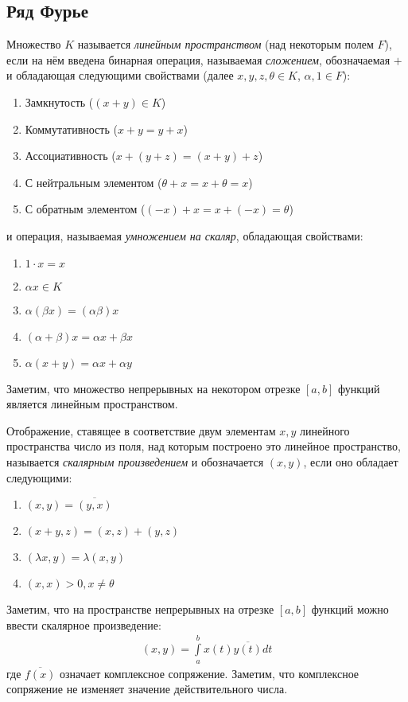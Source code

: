 \documentclass[a4paper]{article}
\begin{document}
\subsection*{Ряд Фурье}

Множество $K$ называется {\it линейным пространством} (над некоторым полем $F$),
если на нём введена бинарная операция, называемая {\it сложением},
обозначаемая $+$ и обладающая следующими свойствами
(далее $x, y, z, \theta \in K$, $\alpha, 1 \in F$):
\begin{enumerate}
    \item Замкнутость ($(x + y) \in K$)
    \item Коммутативность ($x + y = y + x$)
    \item Ассоциативность ($x + (y + z) = (x + y) + z$)
    \item С нейтральным элементом ($\theta + x = x + \theta = x$)
    \item С обратным элементом ($(-x) + x = x + (-x) = \theta$)
\end{enumerate}
и операция, называемая {\it умножением на скаляр}, обладающая свойствами:
\begin{enumerate}
    \item $1 \cdot x = x$
    \item $\alpha x \in K$
    \item $\alpha (\beta x) = (\alpha \beta) x$
    \item $(\alpha + \beta)x = \alpha x + \beta x$
    \item $\alpha(x + y) = \alpha x + \alpha y$
\end{enumerate}

Заметим, что множество непрерывных на некотором отрезке $[a, b]$ функций
является линейным пространством.

Отображение, ставящее в соответствие двум элементам $x, y$ линейного пространства
число из поля, над которым построено это линейное пространство,
называется {\it скалярным произведением} и обозначается $(x, y)$,
если оно обладает следующими:
\begin{enumerate}
    \item $(x, y) = \overline{(y, x)}$
    \item $(x + y, z) = (x, z) + (y, z)$
    \item $(\lambda x, y) = \lambda(x, y)$
    \item $(x, x) > 0, x \not= \theta$
\end{enumerate}

Заметим, что на пространстве непрерывных на отрезке $[a, b]$
функций можно ввести скалярное произведение:
\begin{gather*}
    (x, y) = \int\limits_a^b x(t)\overline{y(t)}dt
\end{gather*}
где $\overline{f(x)}$ означает комплексное сопряжение. Заметим,
что комплексное сопряжение не изменяет значение действительного числа.
\end{document}
